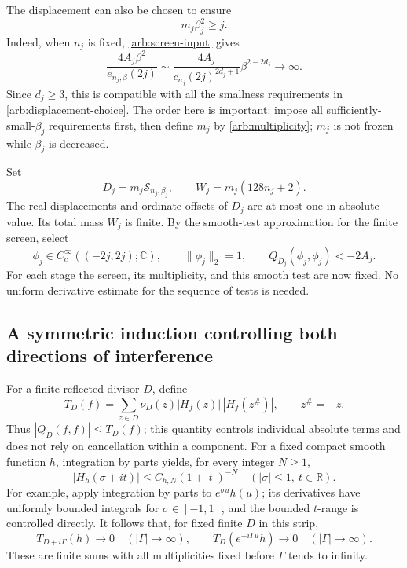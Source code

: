 The displacement can also be chosen to ensure
\begin{equation}\label{arb:weighted-choice}
 m_j\beta_j^2\ge j.
\end{equation}
Indeed, when \(n_j\) is fixed, \eqref{arb:screen-input} gives
\[
 \frac{4A_j\beta^2}{e_{n_j,\beta}(2j)}
 \sim\frac{4A_j}{c_{n_j}(2j)^{2d_j+1}}
                    \beta^{2-2d_j}\longrightarrow\infty.
\]
Since \(d_j\ge3\), this is compatible with all the smallness
requirements in \eqref{arb:displacement-choice}. The order here
is important: impose all sufficiently-small-\(\beta_j\)
requirements first, then define \(m_j\) by
\eqref{arb:multiplicity}; \(m_j\) is not frozen while
\(\beta_j\) is decreased.

Set
\begin{equation}\label{arb:finite-component}
 D_j=m_j\mathcal S_{n_j,\beta_j},\qquad
 W_j=m_j(128n_j+2).
\end{equation}
The real displacements and ordinate offsets of \(D_j\) are
at most one in absolute value. Its total mass \(W_j\) is finite.
By the smooth-test approximation for the finite screen, select
\begin{equation}\label{arb:unmodulated-witness}
 \phi_j\in C_c^\infty((-2j,2j);\mathbb C),\qquad
 \|\phi_j\|_2=1,\qquad Q_{D_j}(\phi_j,\phi_j)<-2A_j.
\end{equation}
For each stage the screen, its multiplicity, and this smooth
test are now fixed. No uniform derivative estimate for the
sequence of tests is needed.

\subsection{A symmetric induction controlling both directions of interference}

For a finite reflected divisor \(D\), define
\begin{equation}\label{arb:absolute-terms}
 T_D(f)=\sum_{z\in D}\nu_D(z)
                  |H_f(z)|\,|H_f(z^\#)|,
 \qquad z^\#=-\overline z.
\end{equation}
Thus \(|Q_D(f,f)|\le T_D(f)\); this quantity controls
individual absolute terms and does not rely on cancellation
within a component. For a fixed compact smooth function \(h\),
integration by parts yields, for every integer \(N\ge1\),
\begin{equation}\label{arb:fourier-decay}
 |H_h(\sigma+it)|\le C_{h,N}(1+|t|)^{-N}
       \quad(|\sigma|\le1,\ t\in\mathbb R).
\end{equation}
For example, apply integration by parts to \(e^{\sigma u}h(u)\);
its derivatives have uniformly bounded integrals for
\(\sigma\in[-1,1]\), and the bounded \(t\)-range is controlled
directly. It follows that, for fixed finite \(D\) in this strip,
\begin{equation}\label{arb:decay-limits}
 T_{D+i\Gamma}(h)\longrightarrow0\quad(|\Gamma|\to\infty),
 \qquad
 T_D(e^{-i\Gamma u}h)\longrightarrow0\quad(|\Gamma|\to\infty).
\end{equation}
These are finite sums with all multiplicities fixed before
\(\Gamma\) tends to infinity.

